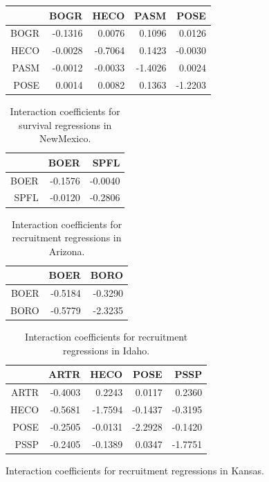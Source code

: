 \documentclass[12pt,]{article}
\begin{document}
\begin{table}[ht]
\begin{tabular}{rrrrr}
  \hline
 & BOGR & HECO & PASM & POSE \\ 
  \hline
BOGR & -0.1316 & 0.0076 & 0.1096 & 0.0126 \\ 
  HECO & -0.0028 & -0.7064 & 0.1423 & -0.0030 \\ 
  PASM & -0.0012 & -0.0033 & -1.4026 & 0.0024 \\ 
  POSE & 0.0014 & 0.0082 & 0.1363 & -1.2203 \\ 
   \hline
\end{tabular}
\end{table}\begin{table}[ht]
\centering
\caption{Interaction coefficients for survival regressions in NewMexico.} 
\begin{tabular}{rrr}
  \hline
 & BOER & SPFL \\ 
  \hline
BOER & -0.1576 & -0.0040 \\ 
  SPFL & -0.0120 & -0.2806 \\ 
   \hline
\end{tabular}
\end{table}\begin{table}[ht]
\centering
\caption{Interaction coefficients for recruitment regressions in Arizona.} 
\begin{tabular}{rrr}
  \hline
 & BOER & BORO \\ 
  \hline
BOER & -0.5184 & -0.3290 \\ 
  BORO & -0.5779 & -2.3235 \\ 
   \hline
\end{tabular}
\end{table}\begin{table}[ht]
\centering
\caption{Interaction coefficients for recruitment regressions in Idaho.} 
\begin{tabular}{rrrrr}
  \hline
 & ARTR & HECO & POSE & PSSP \\ 
  \hline
ARTR & -0.4003 & 0.2243 & 0.0117 & 0.2360 \\ 
  HECO & -0.5681 & -1.7594 & -0.1437 & -0.3195 \\ 
  POSE & -0.2505 & -0.0131 & -2.2928 & -0.1420 \\ 
  PSSP & -0.2405 & -0.1389 & 0.0347 & -1.7751 \\ 
   \hline
\end{tabular}
\end{table}\begin{table}[ht]
\centering
\caption{Interaction coefficients for recruitment regressions in Kansas.} 

\end{table}
\end{document}
